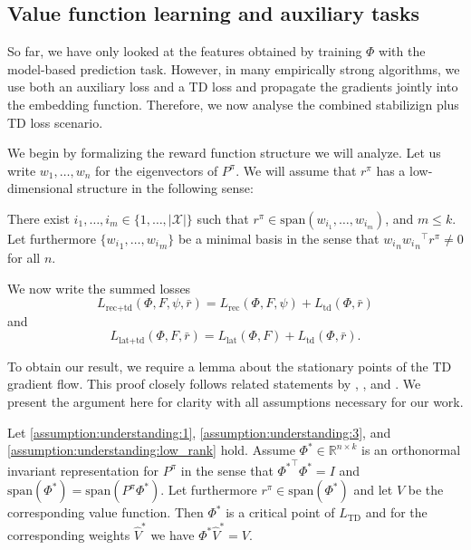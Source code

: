 \subsection{Value function learning and auxiliary tasks}

So far, we have only looked at the features obtained by training $\Phi$ with the model-based prediction task.
However, in many empirically strong algorithms, we use both an auxiliary loss and a TD loss and propagate the gradients jointly into the embedding function.
Therefore, we now analyse the combined stabilizign plus TD loss scenario.

We begin by formalizing the reward function structure we will analyze. 
Let us write $w_1,\dots,w_n$ for the eigenvectors of $P^\pi$. 
We will assume that $r^\pi$ has a low-dimensional structure in the following sense: 

\begin{assumption}\label{assumption:understanding:low_rank}
    There exist $i_1,\dots,i_m \in \{1,\dots,|\mathcal{X}|\}$ such that $r^\pi \in \mathrm{span}(w_{i_1},\dots,w_{i_m})$, and $m\leq k.$ Let furthermore $\{{w_i}_1,\dots,{w_i}_m\}$ be a minimal basis in the sense that ${w_i}_n {{w_i}_n}^\top r^\pi \neq 0$ for all $n$. 
\end{assumption}
We now write the summed losses $$L_{\text{rec}+\text{td}}(\Phi,F,\psi,\bar{r})= L_\text{rec}(\Phi, F, \psi)+L_\text{td}(\Phi, \bar r)$$ and $$L_{\text{lat}+\text{td}}(\Phi,F,\bar{r})= L_\text{lat}(\Phi, F)+L_\text{td}(\Phi, \bar r).$$ 

To obtain our result, we require a lemma about the stationary points of the TD gradient flow.
This proof closely follows related statements by \textcite{ghosh2020representations}, \textcite{tang2022understanding}, and \textcite{lelan2022generalization}. 
We present the argument here for clarity with all assumptions necessary for our work.


\begin{lemma}\label{prop:td_critical}
Let \autoref{assumption:understanding:1}, \autoref{assumption:understanding:3}, and \autoref{assumption:understanding:low_rank} hold.
    Assume $\Phi^* \in \mathbb{R}^{n \times k}$ is an orthonormal invariant representation for $P^\pi$ in the sense that ${\Phi^*}^\top \Phi^* = I$ and $\text{span}(\Phi^*) = \text{span}(P^\pi \Phi^*)$. Let furthermore  $r^\pi \in \text{span}(\Phi^*)$ and let $V$ be the corresponding value function. Then $\Phi^*$ is a critical point of $L_\text{TD}$ and for the corresponding weights $\hat{V}^*$ we have $\Phi^*\hat{V}^* = V$.
\end{lemma}

